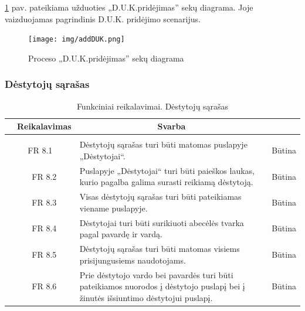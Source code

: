 \documentclass{VUMIFPSkursinis}
\begin{document}
\ref{fig:addduk} pav. pateikiama užduoties „D.U.K.pridėjimas” sekų diagrama. Joje vaizduojamas pagrindinis
D.U.K. pridėjimo scenarijus.
\begin{figure}[H]
	\centering
	\texttt{[image: img/addDUK.png]}
	\caption{Proceso „D.U.K.pridėjimas” sekų diagrama}
	\label{fig:addduk}
\end{figure}

\subsubsection{Dėstytojų sąrašas}

\begin{table}[H]
	\caption{Funkciniai reikalavimai. Dėstytojų sąrašas}
	\begin{tabular}{|p{1cm}|p{1cm}|p{}|p{}|}
		\hline 
		\rowcolor{gray!50}
		\multicolumn{2}{|c|}{{\bfseries Kodas}}&
		\multicolumn{1}{c|}{{\bfseries Reikalavimas}}&
		\multicolumn{1}{c|}{{\bfseries Svarba}}\\
		\hline
		\rowcolor{lightgray}
		\multicolumn{4}{|c|}{Dėstytojų sąrašas}\\		
		
		\hline
		\multicolumn{2}{|c|}{FR 8.1}&
		{Dėstytojų sąrašas turi būti matomas puslapyje „Dėstytojai“.
		}&		
		\multicolumn{1}{c|}{Būtina}\\
		\hline
		\multicolumn{1}{|c}{}&
		\multicolumn{1}{c|}{FR 8.2}&
		{Puslapyje „Dėstytojai“ turi būti paieškos laukas, kurio pagalba galima surasti reikiamą dėstytoją.
		}&		
		\multicolumn{1}{c|}{Būtina}\\
		\hline
		\multicolumn{1}{|c}{}&
		\multicolumn{1}{c|}{FR 8.3}&
		{Visas dėstytojų sąrašas turi būti pateikiamas viename puslapyje.
		}&
		\multicolumn{1}{c|}{Būtina}\\	
		\hline		
		\multicolumn{1}{|c}{}&
		\multicolumn{1}{c|}{FR 8.4}&
		{Dėstytojai turi būti surikiuoti abecėlės tvarka pagal pavardę ir vardą.
		}&
		\multicolumn{1}{c|}{Būtina}\\									
		\hline
		\multicolumn{1}{|c}{}&
		\multicolumn{1}{c|}{FR 8.5}&
		{Dėstytojų sąrašas turi būti matomas visiems prisijungusiems naudotojams.
		}&
		\multicolumn{1}{c|}{Būtina}\\	
		\hline	
		\multicolumn{1}{|c}{}&
		\multicolumn{1}{c|}{FR 8.6}&
		{Prie dėstytojo vardo bei pavardės turi būti pateikiamos nuorodos į dėstytojo puslapį bei į žinutės išsiuntimo dėstytojui puslapį.
		}&
		\multicolumn{1}{c|}{Būtina}\\	
		\hline		
	\end{tabular}		
\end{table}
\end{document}
